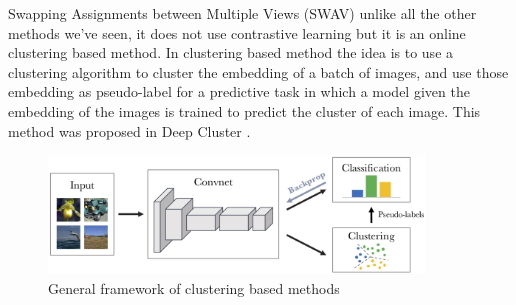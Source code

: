 Swapping Assignments between Multiple Views (SWAV) \cite{caron2020unsupervised} unlike all the other methods we've seen, it does not use contrastive learning but it is an online clustering based method. In clustering based method the idea is to use a clustering algorithm to cluster the embedding of a batch of images, and use those embedding as pseudo-label for a predictive task in which a model given the embedding of the images is trained to predict the cluster of each image. This method was proposed in Deep Cluster \cite{caron2018deep}.
\begin{figure}[H]
	\centering
	\includegraphics[width=10cm]{./images/deep_cluster.png}
	\caption{General framework of clustering based methods}
\end{figure}

